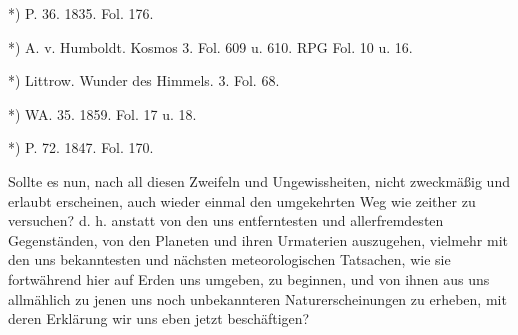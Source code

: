 \documentclass[a4paper, 11pt, oneside, polutonikogreek, german]{article}
\begin{document}
*) P. 36. 1835. Fol. 176.

*) A. v. Humboldt. Kosmos 3. Fol. 609 u. 610. RPG Fol. 10 u. 16.

*) Littrow. Wunder des Himmels. 3. Fol. 68.

*) WA. 35. 1859. Fol. 17 u. 18.

*) P. 72. 1847. Fol. 170.

Sollte es nun, nach all diesen Zweifeln und Ungewissheiten, nicht zweckmäßig und erlaubt erscheinen, auch wieder einmal den umgekehrten Weg wie zeither zu versuchen? d. h. anstatt von den uns entferntesten und allerfremdesten Gegenständen, von den Planeten und ihren Urmaterien auszugehen, vielmehr mit den uns bekanntesten und nächsten meteorologischen Tatsachen, wie sie fortwährend hier auf Erden uns umgeben, zu beginnen, und von ihnen aus uns allmählich zu jenen uns noch unbekannteren Naturerscheinungen zu erheben, mit deren Erklärung wir uns eben jetzt beschäftigen?
\end{document}
